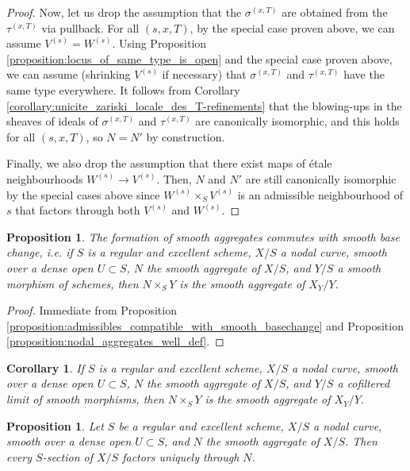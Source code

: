 \documentclass[a4paper,10pt,twoside]{article}
\newtheorem{cor}[thm]{Corollary}
\newtheorem{prop}[thm]{Proposition}
\theoremstyle{definition}
\theoremstyle{remark}
\begin{document}
\begin{proof}
Now, let us drop the assumption that the $\sigma^{(x,T)}$ are obtained from the $\tau^{(x,T)}$ via pullback. For all $(s,x,T)$, by the special case proven above, we can assume $V^{(s)}=W^{(s)}$. Using Proposition \ref{proposition:locus_of_same_type_is_open} and the special case proven above, we can assume (shrinking $V^{(s)}$ if necessary) that $\sigma^{(x,T)}$ and $\tau^{(x,T)}$ have the same type everywhere. It follows from Corollary \ref{corollary:unicite_zariski_locale_des_T-refinements} that the blowing-ups in the sheaves of ideals of $\sigma^{(x,T)}$ and $\tau^{(x,T)}$ are canonically isomorphic, and this holds for all $(s,x,T)$, so $N=N'$ by construction.

Finally, we also drop the assumption that there exist maps of \'etale neighbourhoods $W^{(s)}\to V^{(s)}$. Then, $N$ and $N'$ are still canonically isomorphic by the special cases above since $W^{(s)}\times_S V^{(s)}$ is an admissible neighbourhood of $s$ that factors through both $V^{(s)}$ and $W^{(s)}$.
\end{proof}

\begin{prop}\label{proposition:nodal_aggregates_commute_w_smooth_maps}
The formation of smooth aggregates commutes with smooth base change, i.e. if $S$ is a regular and excellent scheme, $X/S$ a nodal curve, smooth over a dense open $U\subset S$, $N$ the smooth aggregate of $X/S$, and $Y/S$ a smooth morphism of schemes, then $N\times_S Y$ is the smooth aggregate of $X_Y/Y$.
\end{prop}

\begin{proof}
Immediate from Proposition \ref{proposition:admissibles_compatible_with_smooth_basechange} and Proposition \ref{proposition:nodal_aggregates_well_def}.
\end{proof}

\begin{cor}\label{corollary:nodal_aggregates_commute_w_limits_of_smooth_maps}
If $S$ is a regular and excellent scheme, $X/S$ a nodal curve, smooth over a dense open $U\subset S$, $N$ the smooth aggregate of $X/S$, and $Y/S$ a cofiltered limit of smooth morphisms, then $N\times_S Y$ is the smooth aggregate of $X_Y/Y$.
\end{cor}


\begin{prop}\label{proposition:sections_factor_through_nodal_aggregates}
Let $S$ be a regular and excellent scheme, $X/S$ a nodal curve, smooth over a dense open $U\subset S$, and $N$ the smooth aggregate of $X/S$. Then every $S$-section of $X/S$ factors uniquely through $N$.
\end{prop}
\end{document}
